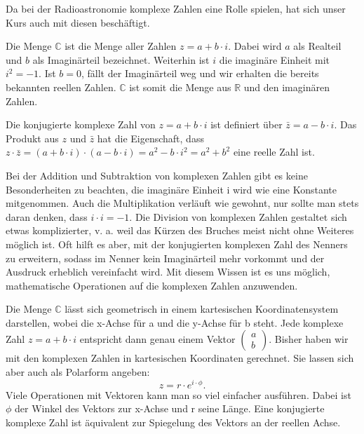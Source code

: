 \documentclass[]{dsadokumentation}
\begin{document}
Da bei der Radioastronomie komplexe Zahlen eine Rolle spielen, hat sich unser Kurs auch mit diesen beschäftigt.

Die Menge $\mathbb{C}$ ist die Menge aller Zahlen $z=a+b\cdot i$. Dabei wird $a$ als Realteil und $b$ als Imaginärteil bezeichnet. Weiterhin ist $i$ die imagin\"are Einheit mit $i^{2} = -1$. Ist $b = 0$, fällt der Imaginärteil weg und wir erhalten die bereits bekannten reellen Zahlen. $\mathbb{C}$ ist somit die Menge aus $\mathbb{R}$ und den imaginären Zahlen.

Die konjugierte komplexe Zahl von $z=a+b\cdot i$ ist definiert über $\bar{z}=a-b\cdot i$. Das Produkt aus $z$ und $\bar{z}$ hat die Eigenschaft, dass $z\cdot \bar{z}=(a+b\cdot i)\cdot (a-b\cdot i)=a^2-b\cdot i^2=a^2+b^2$ eine reelle Zahl ist.

Bei der Addition und Subtraktion von komplexen Zahlen gibt es keine Besonderheiten zu beachten, die imaginäre Einheit i wird wie eine Konstante mitgenommen. Auch die Multiplikation verläuft wie gewohnt, nur sollte man stets daran denken, dass $i\cdot i=-1$.
Die Division von komplexen Zahlen gestaltet sich etwas komplizierter, v. a. weil das Kürzen des Bruches meist nicht ohne Weiteres möglich ist. Oft hilft es aber, mit der konjugierten komplexen Zahl des Nenners zu erweitern, sodass im Nenner kein Imaginärteil mehr vorkommt und der Ausdruck erheblich vereinfacht wird. Mit diesem Wissen ist es uns möglich, mathematische Operationen auf die komplexen Zahlen anzuwenden.

Die Menge $\mathbb{C}$ lässt sich geometrisch in einem kartesischen Koordinatensystem darstellen, wobei die x-Achse für a und die y-Achse für b steht. Jede komplexe Zahl $z=a+b\cdot i$ entspricht dann genau einem Vektor $\begin{pmatrix} a \\b
  \end{pmatrix}$.
Bisher haben wir mit den komplexen Zahlen in kartesischen Koordinaten gerechnet. Sie lassen sich aber auch als Polarform angeben:
\begin{equation}
  z=r\cdot e^{i\cdot\phi}.
\end{equation}
Viele Operationen mit Vektoren kann man so viel einfacher ausführen. Dabei ist $\phi$ der Winkel des Vektors zur x-Achse und r seine Länge. Eine konjugierte komplexe Zahl ist äquivalent zur Spiegelung des Vektors an der reellen Achse.
\end{document}
